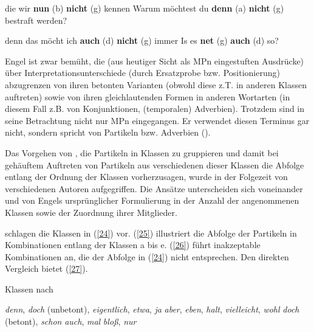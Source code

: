 \begin{exe}
	\ex\label{22} 
		\begin{xlist}	
			\ex\label{22a} die wir \textbf{nun} (b) \textbf{nicht} (g) kennen
			\ex\label{22b} Warum möchtest du \textbf{denn} (a) \textbf{nicht} (g) bestraft werden?
		\end{xlist}
\end{exe}

\begin{exe}
	\ex\label{23} 
		\begin{xlist}	
			\ex\label{23a} denn das möcht ich \textbf{auch} (d) \textbf{nicht} (g) immer
			\ex\label{23b} Is es \textbf{net} (g) \textbf{auch} (d) so?	
			\hfill\hbox {\citet[94]{Engel1968}}
		\end{xlist}
\end{exe}
Engel ist zwar bemüht, die (aus heutiger Sicht als MPn eingestuften Ausdrücke) über Interpretationsunterschiede (durch Ersatzprobe bzw. Positionierung) abzugrenzen von ihren betonten Varianten (obwohl diese z.T. in anderen Klassen auftreten) sowie von ihren gleichlautenden Formen in anderen Wortarten (in diesem Fall z.B. von Konjunktionen, (temporalen) Adverbien). Trotzdem sind in seine Betrachtung nicht nur MPn eingegangen. Er verwendet diesen Terminus gar nicht, sondern spricht von \glqq Partikeln\grqq{} bzw. \glqq Adverbien\grqq{} (\citealt[91/85]{Engel1968}). 

Das Vorgehen von \citet{Engel1968}, die Partikeln in Klassen zu gruppieren und damit bei gehäuftem Auftreten von Partikeln aus verschiedenen dieser Klassen die Abfolge entlang der Ordnung der Klassen vorherzusagen, wurde in der Folgezeit von verschiedenen Autoren aufgegriffen. Die Ansätze unterscheiden sich voneinander und von Engels ursprünglicher Formulierung in der Anzahl der angenommenen Klassen sowie der Zuordnung ihrer Mitglieder.

\citet{Helbig1981} schlagen die Klassen in (\ref{24}) vor. (\ref{25}) illustriert die Abfolge der Partikeln in Kombinationen entlang der Klassen a bis e. (\ref{26}) führt inakzep\-table Kombinationen an, die der Abfolge in (\ref{24}) nicht entsprechen. Den direkten Vergleich bietet (\ref{27}).

\begin{exe}
	\ex\label{24} 
	 Klassen nach \citet[41/42]{Helbig1981}
		\begin{xlist}	
			\ex\label{24a} \textit{denn}, \textit{doch} (unbetont), \textit{eigentlich}, \textit{etwa}, \textit{ja}
			\ex\label{24b} \textit{aber}, \textit{eben}, \textit{halt}, \textit{vielleicht}, \textit{wohl}
			\ex\label{24c} \textit{doch} (betont), \textit{schon}
			\ex\label{24d} \textit{auch}, \textit{mal}
			\ex\label{24e} \textit{bloß}, \textit{nur}
		\end{xlist}
\end{exe}

